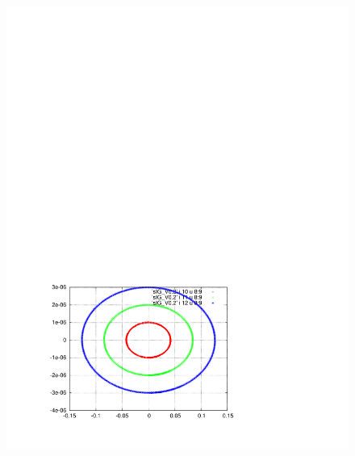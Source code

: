 \documentclass[]{article}
\begin{document}
\begin{figure}[h]
\begin{minipage}[b]{0.45\linewidth}
\includegraphics[scale=0.6]{pdf/delta_vs_ct_V0p2.pdf}
\end{minipage}
%
\hskip 1cm
%
\begin{minipage}[b]{0.45\linewidth}
\centering

\end{minipage}
\end{figure}
\end{document}
